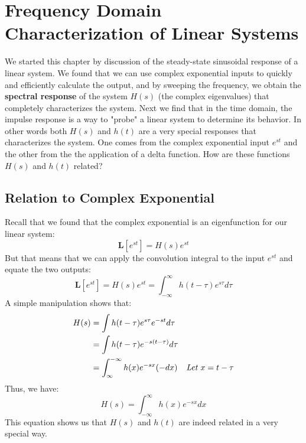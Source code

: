 \section{Frequency Domain Characterization of Linear Systems}
We started this chapter by discussion of the steady-state sinusoidal response of a linear system.  We found that we can use complex exponential inputs to quickly and efficiently calculate the output, and by sweeping the frequency, we obtain the \textbf{spectral response} of the system $H(s)$ (the complex eigenvalues) that completely characterizes the system.   Next we find that in the time domain, the impulse response is a way to "probe" a linear system to determine its behavior.  In other words both $H(s)$ and $h(t)$ are a very special responses that characterizes the system.  One comes from the complex exponential input $e^{st}$ and the other from the the application of a delta function.  How are these functions $H(s)$ and $h(t)$ related?
\subsection{Relation to Complex Exponential}
Recall that we found that the complex exponential is an eigenfunction for our linear system:
    \begin{equation}
        \mathbf{L} [ e^{st} ] = H(s) e^{st}
    \end{equation}
But that means that we can apply the convolution integral to the input $e^{st}$ and equate the two outputs:
    \begin{equation}
        \mathbf{L} [ e^{st} ] = H(s) e^{st}  = \int_{-\infty}^{\infty} h(t-\tau) e^{s\tau} d\tau
    \end{equation}
A simple manipulation shows that:
    \begin{align*}
        H(s) &= \int h(t-\tau) e^{s\tau} e^{-st} d\tau\\
        &= \int h(t-\tau) e^{-s(t- \tau)} d\tau\\
        &= \int_{\infty}^{-\infty} h(x) e^{-sx} (-dx) &\text{\emph{Let $x = t - \tau$}}
    \end{align*}
Thus, we have:
    \begin{equation}
        H(s) = \int_{-\infty}^{\infty} h(x) e^{-sx} dx
    \end{equation}
This equation shows us that $H(s)$ and $h(t)$ are indeed related in a very special way.
